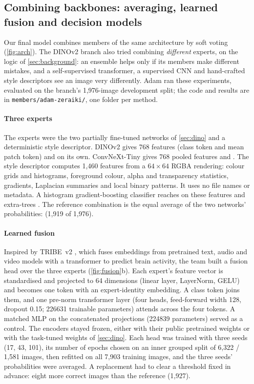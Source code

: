 \subsection{Combining backbones: averaging, learned fusion and decision models}
\label{sec:fusion}
Our final model combines members of the same architecture by soft voting (\cref{fig:arch}). The DINOv2 branch also tried combining \emph{different} experts, on the logic of \cref{sec:background}: an ensemble helps only if its members make different mistakes, and a self-supervised transformer, a supervised CNN and hand-crafted style descriptors see an image very differently. Adam ran these experiments, evaluated on the branch's 1{,}976-image development split\rep; the code and results are in \nolinkurl{members/adam-zeraiki/}, one folder per method.

\paragraph{Three experts} The experts were the two partially fine-tuned networks of \cref{sec:dino} and a deterministic style descriptor. DINOv2 gives 768 features (class token and mean patch token) and  on its own. ConvNeXt-Tiny gives 768 pooled features and . The style descriptor computes 1{,}460 features from a $64\times64$ RGBA rendering: colour grids and histograms, foreground colour, alpha and transparency statistics, gradients, Laplacian summaries and local binary patterns. It uses no file names or metadata. A histogram gradient-boosting classifier reaches  on these features and extra-trees . The reference combination is the equal average of the two networks' probabilities:  (1{,}919 of 1{,}976).

\paragraph{Learned fusion} Inspired by TRIBE~v2 \cite{dascoli2026tribe}, which fuses embeddings from pretrained text, audio and video models with a transformer to predict brain activity, the team built a fusion head over the three experts (\cref{fig:fusion}b). Each expert's feature vector is standardised and projected to 64 dimensions (linear layer, LayerNorm, GELU) and becomes one token with an expert-identity embedding. A class token joins them, and one pre-norm transformer layer (four heads, feed-forward width 128, dropout 0.15; \num{226631} trainable parameters) attends across the four tokens. A matched MLP on the concatenated projections (\num{224839} parameters) served as a control. The encoders stayed frozen, either with their public pretrained weights or with the task-tuned weights of \cref{sec:dino}. Each head was trained with three seeds (17, 43, 101), its number of epochs chosen on an inner grouped split of 6{,}322 / 1{,}581 images, then refitted on all 7{,}903 training images, and the three seeds' probabilities were averaged. A replacement had to clear a threshold fixed in advance: eight more correct images than the reference (1{,}927).

